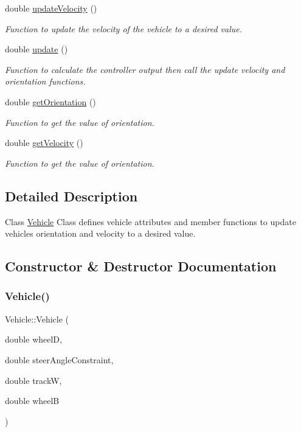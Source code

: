 \begin{DoxyCompactItemize}
double \mbox{\hyperlink{classVehicle_a6575495307173c35f263c09563d8ad4d}{update\+Velocity}} ()
\begin{DoxyCompactList}\small\item\em Function to update the velocity of the vehicle to a desired value. \end{DoxyCompactList}\item 
double \mbox{\hyperlink{classVehicle_a4748e1fcd6fb7449ebdcf9982c4da71f}{update}} ()
\begin{DoxyCompactList}\small\item\em Function to calculate the controller output then call the update velocity and orientation functions. \end{DoxyCompactList}\item 
double \mbox{\hyperlink{classVehicle_a5244052aac95a5cf86572bfa19916415}{get\+Orientation}} ()
\begin{DoxyCompactList}\small\item\em Function to get the value of orientation. \end{DoxyCompactList}\item 
double \mbox{\hyperlink{classVehicle_a8a4a94bb5079a888ae499a94ec70d550}{get\+Velocity}} ()
\begin{DoxyCompactList}\small\item\em Function to get the value of orientation. \end{DoxyCompactList}\end{DoxyCompactItemize}


\subsection{Detailed Description}
Class \mbox{\hyperlink{classVehicle}{Vehicle}} Class defines vehicle attributes and member functions to update vehicle\textquotesingle{}s orientation and velocity to a desired value. 

\subsection{Constructor \& Destructor Documentation}
\mbox{\label{classVehicle_a28e612a4fb57d620a4a6dd85befb287b}} 
\subsubsection{\texorpdfstring{Vehicle()}{Vehicle()}}
{\footnotesize\ttfamily Vehicle\+::\+Vehicle (\begin{DoxyParamCaption}\item[{double}]{wheelD,  }\item[{double}]{steer\+Angle\+Constraint,  }\item[{double}]{trackW,  }\item[{double}]{wheelB }\end{DoxyParamCaption})}



